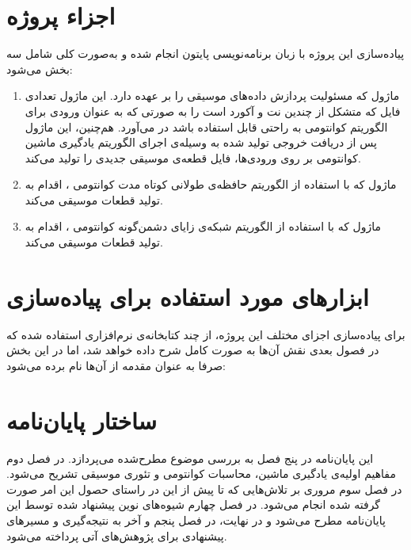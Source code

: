 \newpage
\section{اجزاء پروژه} \label{sec:parts}
پیاده‌سازی این پروژه با زبان برنامه‌نویسی پایتون انجام شده و به‌صورت کلی شامل سه بخش می‌شود:
\begin{enumerate}
    \item ماژول
    که مسئولیت پردازش داده‌های موسیقی را بر عهده دارد. این ماژول تعدادی فایل که متشکل از چندین نت و آکورد است را به صورتی که به عنوان ورودی برای الگوریتم کوانتومی به راحتی قابل استفاده باشد در می‌آورد. هم‌چنین، این ماژول پس از دریافت خروجی تولید شده به وسیله‌ی اجرای الگوریتم یادگیری ماشین کوانتومی بر روی ورودی‌ها، فایل قطعه‌ی موسیقی جدیدی را تولید می‌کند.
    \item ماژول
    که با استفاده از الگوریتم حافظه‌ی طولانی کوتاه مدت کوانتومی
    \cite{chen_qlstm}،
    اقدام به تولید قطعات موسیقی می‌کند.
    
    \item ماژول
    که با استفاده از الگوریتم شبکه‌ی زایای دشمن‌گونه کوانتومی
    \cite{lloyd_qugan} \cite{zoufal_qugan}،
    اقدام به تولید قطعات موسیقی می‌کند.

\end{enumerate}

\section{ابزارهای مورد استفاده برای پیاده‌سازی}

برای پیاده‌سازی اجزای مختلف این پروژه، از چند کتابخانه‌ی نرم‌افزاری استفاده شده که در فصول بعدی نقش آن‌ها به صورت کامل شرح داده خواهد شد، اما در این بخش صرفا به عنوان مقدمه از آن‌ها نام برده می‌شود:

\vspace{-1.7cm}
\section{ساختار پایان‌نامه}
این پایان‌نامه در پنج فصل به بررسی موضوع مطرح‌شده می‌پردازد. در فصل دوم مفاهیم اولیه‌ی یادگیری ماشین، محاسبات کوانتومی و تئوری موسیقی تشریح می‌شود. در فصل سوم مروری بر تلاش‌هایی که تا پیش از این در راستای حصول این امر صورت گرفته شده انجام می‌شود.
در فصل چهارم شیوه‌های نوین پیشنهاد شده توسط این پایان‌نامه مطرح می‌شود و در نهایت، در فصل پنجم و آخر به نتیجه‌گیری و مسیرهای پیشنهادی برای پژوهش‌های آتی پرداخته می‌شود.